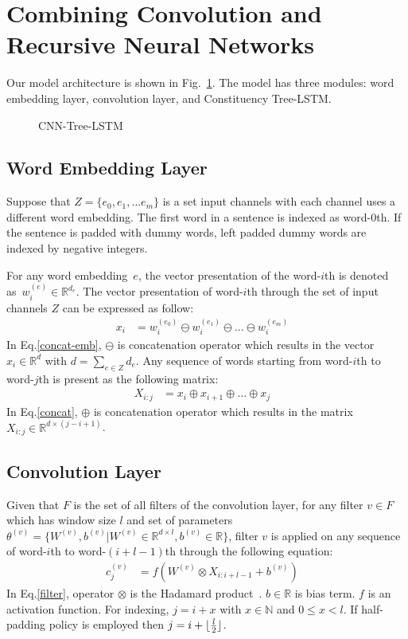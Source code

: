 \section{Combining Convolution and Recursive Neural Networks}\label{sec:cnn-treelstm}

Our model architecture is shown in Fig.~\ref{fig:cnntreelstm}.
The model has three modules: word embedding layer, convolution layer, and Constituency Tree-LSTM.

\begin{figure} [H]
    \centering
    
    \caption[CNN-Tree-LSTM]{CNN-Tree-LSTM}
    \label{fig:cnntreelstm} %
\end{figure}

\subsection{Word Embedding Layer}
Suppose that \(Z = \{e_0, e_1, \ldots e_m\}\) is a set input channels with each channel uses a different word embedding.
The first word in a sentence is indexed as word-\(0\)th.
If the sentence is padded with dummy words, left padded dummy words are indexed by negative integers.

For any word embedding~\(e\), the vector presentation of the word-\(i\)th is denoted as~\(w^{(e)}_i \in \mathbb{R}^{d_e}\).
The vector presentation of word-\(i\)th through the set of input channels \(Z\) can be expressed as follow:
\begin{align}
 x_i &= w^{(e_0)}_i \ominus w^{(e_1)}_i \ominus  \ldots \ominus w^{(e_m)}_i&\label{concat-emb}
\end{align}
In Eq.\eqref{concat-emb}, \(\ominus\) is concatenation operator which results in the vector \(x_i \in \mathbb{R}^{d}\) with \(d = \sum_{e \in Z} d_e\).
Any sequence of words starting from word-\(i\)th to word-\(j\)th is present as the following matrix:
\begin{align}
X_{i:j} &= x_i \oplus x_{i+1} \oplus \ldots \oplus x_j &\label{concat}
\end{align}
In Eq.\eqref{concat}, \(\oplus\) is concatenation operator which results in the matrix \(X_{i:j} \in \mathbb{R}^{d \times (j-i+1)}\).
\subsection{Convolution Layer}\label{sec:cnn}
Given that \(F\) is the set of all filters of the convolution layer, for any filter \(v \in F\) which has window size \(l\) and set of parameters \(\theta^{(v)} = \{ W^{(v)}, b^{(v)} | W^{(v)} \in \mathbb{R}^{d \times l}, b^{(v)} \in \mathbb{R}\}\), filter \({v}\) is applied on any sequence of word-\(i\)th to word-\((i+l-1)\)th through the following equation:
\begin{align}
c^{(v)}_j &= f(W^{(v)} \otimes X_{i:i+l-1} + b^{(v)}) &\label{filter}
\end{align}
In Eq.\eqref{filter}, operator \(\otimes\) is the Hadamard product~\cite{element-prod}.
\(b \in \mathbb{R}\) is bias term. \(f\) is an activation function.
For indexing, \(j = i + x\) with \(x \in \mathbb{N}\) and \(0 \leq x < l\).
If half-padding policy is employed then \(j = i + \lfloor \frac{l}{2} \rfloor\).

